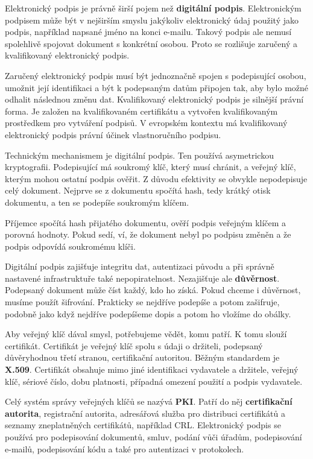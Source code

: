 \documentclass[11pt,a4paper]{article}
\begin{document}
Elektronický podpis je právně širší pojem než \textbf{digitální podpis}. Elektronickým podpisem může být v nejširším smyslu jakýkoliv elektronický údaj použitý jako podpis, například napsané jméno na konci e-mailu. Takový podpis ale nemusí spolehlivě spojovat dokument s konkrétní osobou. Proto se rozlišuje zaručený a kvalifikovaný elektronický podpis.

Zaručený elektronický podpis musí být jednoznačně spojen s podepisující osobou, umožnit její identifikaci a být k podepsaným datům připojen tak, aby bylo možné odhalit následnou změnu dat. Kvalifikovaný elektronický podpis je silnější právní forma. Je založen na kvalifikovaném certifikátu a vytvořen kvalifikovaným prostředkem pro vytváření podpisů. V evropském kontextu má kvalifikovaný elektronický podpis právní účinek vlastnoručního podpisu.

Technickým mechanismem je digitální podpis. Ten používá asymetrickou kryptografii. Podepisující má soukromý klíč, který musí chránit, a veřejný klíč, kterým mohou ostatní podpis ověřit. Z důvodu efektivity se obvykle nepodepisuje celý dokument. Nejprve se z dokumentu spočítá hash, tedy krátký otisk dokumentu, a ten se podepíše soukromým klíčem.

Příjemce spočítá hash přijatého dokumentu, ověří podpis veřejným klíčem a porovná hodnoty. Pokud sedí, ví, že dokument nebyl po podpisu změněn a že podpis odpovídá soukromému klíči.

Digitální podpis zajišťuje integritu dat, autentizaci původu a při správně nastavené infrastruktuře také nepopiratelnost. Nezajišťuje ale \textbf{důvěrnost}. Podepsaný dokument může číst každý, kdo ho získá. Pokud chceme i důvěrnost, musíme použít šifrování. Prakticky se nejdříve podepíše a potom zašifruje, podobně jako když nejdříve podepíšeme dopis a potom ho vložíme do obálky.

Aby veřejný klíč dával smysl, potřebujeme vědět, komu patří. K tomu slouží certifikát. Certifikát je veřejný klíč spolu s údaji o držiteli, podepsaný důvěryhodnou třetí stranou, certifikační autoritou. Běžným standardem je \textbf{X.509}. Certifikát obsahuje mimo jiné identifikaci vydavatele a držitele, veřejný klíč, sériové číslo, dobu platnosti, případná omezení použití a podpis vydavatele.

Celý systém správy veřejných klíčů se nazývá \textbf{PKI}. Patří do něj \textbf{certifikační autorita}, registrační autorita, adresářová služba pro distribuci certifikátů a seznamy zneplatněných certifikátů, například CRL. Elektronický podpis se používá pro podepisování dokumentů, smluv, podání vůči úřadům, podepisování e-mailů, podepisování kódu a také pro autentizaci v protokolech.
\end{document}
